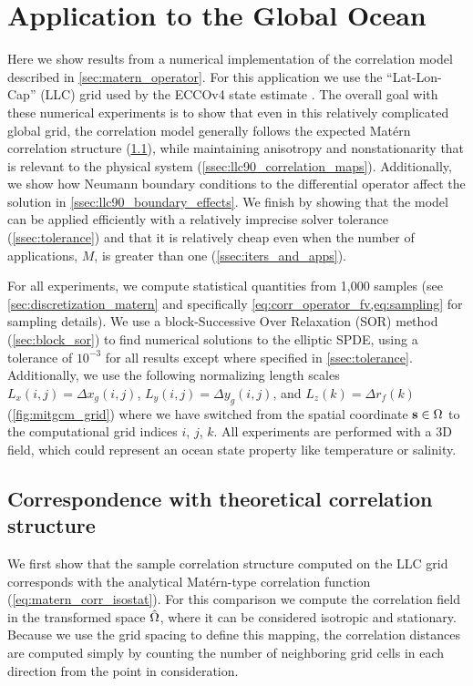 \section{Application to the Global Ocean}
\label{sec:llc90}

Here we show results from a numerical implementation of the correlation model
described in \cref{sec:matern_operator}.
For this application we use the ``Lat-Lon-Cap'' (LLC) grid used by the ECCOv4
state estimate \cite[][see Sec. 2 for a complete description of the grid]{forgetECCOv4}.
The overall goal with these numerical experiments is to show that even in this
relatively complicated global grid, the
correlation model generally follows the expected Mat\'ern correlation structure
(\cref{ssec:llc90_correlations}), while maintaining
anisotropy and nonstationarity that is relevant to the physical system
(\cref{ssec:llc90_correlation_maps}).
Additionally, we show how Neumann boundary conditions to the differential
operator affect the solution in \cref{ssec:llc90_boundary_effects}.
We finish
by showing that the model can be applied efficiently with a relatively imprecise
solver tolerance (\cref{ssec:tolerance}) and that it is relatively cheap even
when the number of applications, $M$, is greater than one
(\cref{ssec:iters_and_apps}).

For all experiments, we compute statistical quantities from 1,000 samples
(see \cref{sec:discretization_matern} and specifically
\cref{eq:corr_operator_fv,eq:sampling} for sampling details).
We use a block-Successive Over Relaxation (SOR) method (\cref{sec:block_sor}) to find numerical
solutions to the elliptic SPDE, using a tolerance of $10^{-3}$ for all results
except where specified in \cref{ssec:tolerance}.
Additionally, we use the following normalizing length scales
$L_x(i,j) = \Delta x_g(i,j)$, $L_y(i,j) = \Delta y_g(i,j)$,
and $L_z(k) = \Delta r_f(k)$ (\cref{fig:mitgcm_grid}) where we have switched
from the spatial coordinate $\mathbf{s}\in\Omega$ to the computational grid indices $i$, $j$, $k$.
All experiments are performed with a 3D field, which could represent an ocean
state property like temperature or salinity.

\subsection{Correspondence with theoretical correlation structure}
\label{ssec:llc90_correlations}

We first show that the sample correlation structure computed on the LLC
grid corresponds with the analytical Mat\'ern-type correlation function
(\cref{eq:matern_corr_isostat}).
For this comparison we compute the correlation field in the transformed space
$\hat{\Omega}$, where it can be considered isotropic and stationary.
Because we use the grid spacing to define this mapping, the correlation
distances are computed simply by counting the number of neighboring grid cells in each
direction from the point in consideration.

